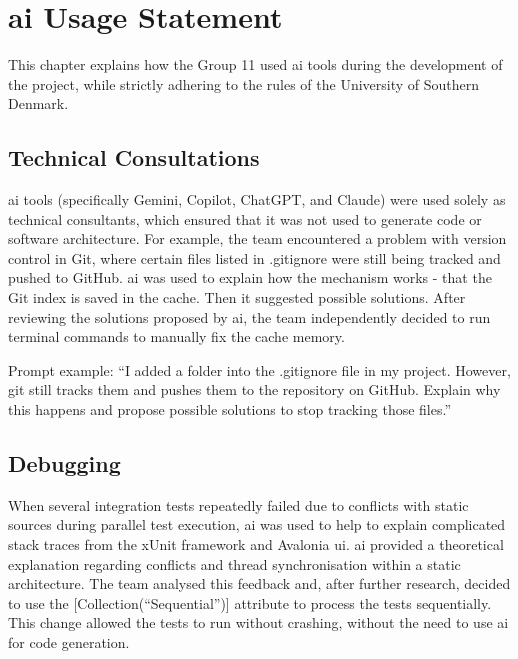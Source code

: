 \section[AI Usage]{\acrshort{ai} Usage Statement}

This chapter explains how the Group 11 used \acrshort{ai} tools during the development of the project, while strictly adhering to the rules of the University of Southern Denmark.

\subsection{Technical Consultations}
\acrshort{ai} tools (specifically Gemini, Copilot, ChatGPT, and Claude) were used solely as technical consultants, which ensured that it was not used to generate code or software architecture. For example, the team encountered a problem with version control in Git, where certain files listed in .gitignore were still being tracked and pushed to GitHub. \acrshort{ai} was used to explain how the mechanism works - that the Git index is saved in the cache. Then it suggested possible solutions. After reviewing the solutions proposed by \acrshort{ai}, the team independently decided to run terminal commands to manually fix the cache memory.

Prompt example: ``I added a folder into the .gitignore file in my project. However, git still tracks them and pushes them to the repository on GitHub. Explain why this happens and propose possible solutions to stop tracking those files.''

\subsection{Debugging}
When several integration tests repeatedly failed due to conflicts with static sources during parallel test execution, \acrshort{ai} was used to help to explain complicated stack traces from the xUnit framework and Avalonia \acrshort{ui}. \acrshort{ai} provided a theoretical explanation regarding conflicts and thread synchronisation within a static architecture. The team analysed this feedback and, after further research, decided to use the [Collection(``Sequential'')] attribute to process the tests sequentially. This change allowed the tests to run without crashing, without the need to use \acrshort{ai} for code generation.

